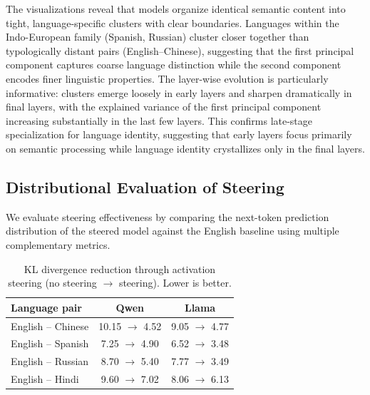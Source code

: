 The visualizations reveal that models organize identical semantic content into tight, language-specific clusters with clear boundaries. Languages within the Indo-European family (Spanish, Russian) cluster closer together than typologically distant pairs (English--Chinese), suggesting that the first principal component captures coarse language distinction while the second component encodes finer linguistic properties. The layer-wise evolution is particularly informative: clusters emerge loosely in early layers and sharpen dramatically in final layers, with the explained variance of the first principal component increasing substantially in the last few layers. This confirms late-stage specialization for language identity, suggesting that early layers focus primarily on semantic processing while language identity crystallizes only in the final layers.

\subsection{Distributional Evaluation of Steering}

We evaluate steering effectiveness by comparing the next-token prediction distribution of the steered model against the English baseline using multiple complementary metrics.

\begin{table}[!htb]
    \centering
    \caption{KL divergence reduction through activation steering (no steering $\rightarrow$ steering). Lower is better.}
    \begin{tabular}{lcc}
    \toprule
    Language pair & Qwen & Llama \\
    \midrule
    English -- Chinese & 10.15 $\rightarrow$ 4.52 & 9.05 $\rightarrow$ 4.77 \\
    English -- Spanish & 7.25 $\rightarrow$ 4.90 & 6.52 $\rightarrow$ 3.48 \\
    English -- Russian & 8.70 $\rightarrow$ 5.40 & 7.77 $\rightarrow$ 3.49 \\
    English -- Hindi & 9.60 $\rightarrow$ 7.02 & 8.06 $\rightarrow$ 6.13 \\
    \bottomrule
    \end{tabular}
    \label{tab:steering_kl}
\end{table}

